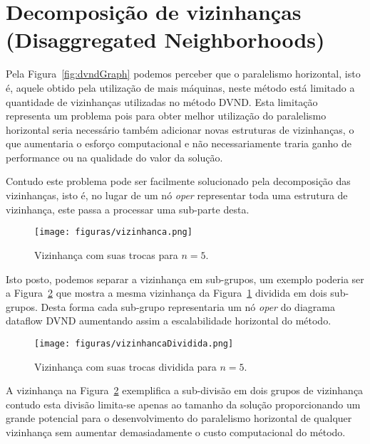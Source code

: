 \section{Decomposição de vizinhanças (Disaggregated Neighborhoods)} \label{subsec:metodologiaDecomposicaoVizinhancas}

Pela Figura~\ref{fig:dvndGraph} podemos perceber que o paralelismo horizontal, isto é, aquele obtido pela utilização de mais máquinas, neste método está limitado a quantidade de vizinhanças utilizadas no método DVND.
Esta limitação representa um problema pois para obter melhor utilização do paralelismo horizontal seria necessário também adicionar novas estruturas de vizinhanças, o que aumentaria o esforço computacional e não necessariamente traria ganho de performance ou na qualidade do valor da solução.

Contudo este problema pode ser facilmente solucionado pela decomposição das vizinhanças, isto é, no lugar de um nó \textit{oper} representar toda uma estrutura de vizinhança, este passa a processar uma sub-parte desta.

\begin{figure}[htbp]
    \centerline{\texttt{[image: figuras/vizinhanca.png]}}
    \caption{Vizinhança com suas trocas para $n=5$.}
    \label{fig:vizinhancaTrocas}
\end{figure}

Isto posto, podemos separar a vizinhança em sub-grupos, um exemplo poderia ser a Figura~\ref{fig:vizinhancaTrocasDividida} que mostra a mesma vizinhança da Figura~\ref{fig:vizinhancaTrocas} dividida em dois sub-grupos. Desta forma cada sub-grupo representaria um nó \textit{oper} do diagrama dataflow DVND aumentando assim a escalabilidade horizontal do método.

\begin{figure}[htbp]
    \centerline{\texttt{[image: figuras/vizinhancaDividida.png]}}
    \caption{Vizinhança com suas trocas dividida para $n=5$.}
    \label{fig:vizinhancaTrocasDividida}
\end{figure}

A vizinhança na Figura~\ref{fig:vizinhancaTrocasDividida} exemplifica a sub-divisão em dois grupos de vizinhança contudo esta divisão limita-se apenas ao tamanho da solução proporcionando um grande potencial para o desenvolvimento do paralelismo horizontal de qualquer vizinhança sem aumentar demasiadamente o custo computacional do método.
